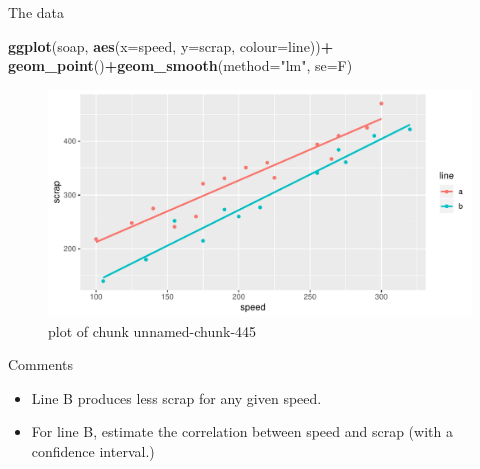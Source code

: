 \documentclass[
  ignorenonframetext,
]{beamer}
\newenvironment{Shaded}{\begin{snugshade}}{\end{snugshade}}
\newcommand{\DataTypeTok}[1]{\textcolor[rgb]{0.13,0.29,0.53}{#1}}
\newcommand{\KeywordTok}[1]{\textcolor[rgb]{0.13,0.29,0.53}{\textbf{#1}}}
\newcommand{\NormalTok}[1]{#1}
\newcommand{\OperatorTok}[1]{\textcolor[rgb]{0.81,0.36,0.00}{\textbf{#1}}}
\newcommand{\StringTok}[1]{\textcolor[rgb]{0.31,0.60,0.02}{#1}}
\providecommand{\tightlist}{%
  \setlength{\itemsep}{0pt}\setlength{\parskip}{0pt}}
\begin{document}
\begin{frame}[fragile]{The data}
\protect\hypertarget{the-data-7}{}

\begin{Shaded}
\begin{Highlighting}[]
\KeywordTok{ggplot}\NormalTok{(soap, }\KeywordTok{aes}\NormalTok{(}\DataTypeTok{x=}\NormalTok{speed, }\DataTypeTok{y=}\NormalTok{scrap, }\DataTypeTok{colour=}\NormalTok{line))}\OperatorTok{+}
\StringTok{  }\KeywordTok{geom_point}\NormalTok{()}\OperatorTok{+}\KeywordTok{geom_smooth}\NormalTok{(}\DataTypeTok{method=}\StringTok{"lm"}\NormalTok{, }\DataTypeTok{se=}\NormalTok{F)}
\end{Highlighting}
\end{Shaded}

\begin{figure}
\centering
\includegraphics{figure/unnamed-chunk-445-1.pdf}
\caption{plot of chunk unnamed-chunk-445}
\end{figure}

\end{frame}

\begin{frame}{Comments}
\protect\hypertarget{comments-28}{}

\begin{itemize}
\tightlist
\item
  Line B produces less scrap for any given speed.
\item
  For line B, estimate the correlation between speed and scrap (with a
  confidence interval.)
\end{itemize}

\end{frame}
\end{document}
